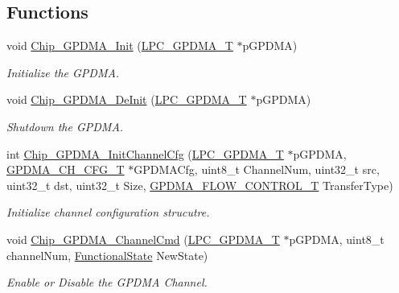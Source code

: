 \subsection*{Functions}
\begin{DoxyCompactItemize}
\item 
void \hyperlink{group___g_p_d_m_a__18_x_x__43_x_x_ga21c99277e4579af4be9d9311a03b5542}{Chip\+\_\+\+G\+P\+D\+M\+A\+\_\+\+Init} (\hyperlink{struct_l_p_c___g_p_d_m_a___t}{L\+P\+C\+\_\+\+G\+P\+D\+M\+A\+\_\+T} $\ast$p\+G\+P\+D\+MA)
\begin{DoxyCompactList}\small\item\em Initialize the G\+P\+D\+MA. \end{DoxyCompactList}\item 
void \hyperlink{group___g_p_d_m_a__18_x_x__43_x_x_ga673cc6cab2ad87185f5f5d0ff8424075}{Chip\+\_\+\+G\+P\+D\+M\+A\+\_\+\+De\+Init} (\hyperlink{struct_l_p_c___g_p_d_m_a___t}{L\+P\+C\+\_\+\+G\+P\+D\+M\+A\+\_\+T} $\ast$p\+G\+P\+D\+MA)
\begin{DoxyCompactList}\small\item\em Shutdown the G\+P\+D\+MA. \end{DoxyCompactList}\item 
int \hyperlink{group___g_p_d_m_a__18_x_x__43_x_x_gac32ac477dbee2d3be93ca90b30db856c}{Chip\+\_\+\+G\+P\+D\+M\+A\+\_\+\+Init\+Channel\+Cfg} (\hyperlink{struct_l_p_c___g_p_d_m_a___t}{L\+P\+C\+\_\+\+G\+P\+D\+M\+A\+\_\+T} $\ast$p\+G\+P\+D\+MA, \hyperlink{struct_g_p_d_m_a___c_h___c_f_g___t}{G\+P\+D\+M\+A\+\_\+\+C\+H\+\_\+\+C\+F\+G\+\_\+T} $\ast$G\+P\+D\+M\+A\+Cfg, uint8\+\_\+t Channel\+Num, uint32\+\_\+t src, uint32\+\_\+t dst, uint32\+\_\+t Size, \hyperlink{group___g_p_d_m_a__18_x_x__43_x_x_ga2cb59b641cd840f22780c44be1208133}{G\+P\+D\+M\+A\+\_\+\+F\+L\+O\+W\+\_\+\+C\+O\+N\+T\+R\+O\+L\+\_\+T} Transfer\+Type)
\begin{DoxyCompactList}\small\item\em Initialize channel configuration strucutre. \end{DoxyCompactList}\item 
void \hyperlink{group___g_p_d_m_a__18_x_x__43_x_x_gae93a1b9cb8ee1a04176ce51a9a4ad073}{Chip\+\_\+\+G\+P\+D\+M\+A\+\_\+\+Channel\+Cmd} (\hyperlink{struct_l_p_c___g_p_d_m_a___t}{L\+P\+C\+\_\+\+G\+P\+D\+M\+A\+\_\+T} $\ast$p\+G\+P\+D\+MA, uint8\+\_\+t channel\+Num, \hyperlink{group___l_p_c___types___public___types_gac9a7e9a35d2513ec15c3b537aaa4fba1}{Functional\+State} New\+State)
\begin{DoxyCompactList}\small\item\em Enable or Disable the G\+P\+D\+MA Channel. \end{DoxyCompactList}\item 

\end{DoxyCompactItemize}
